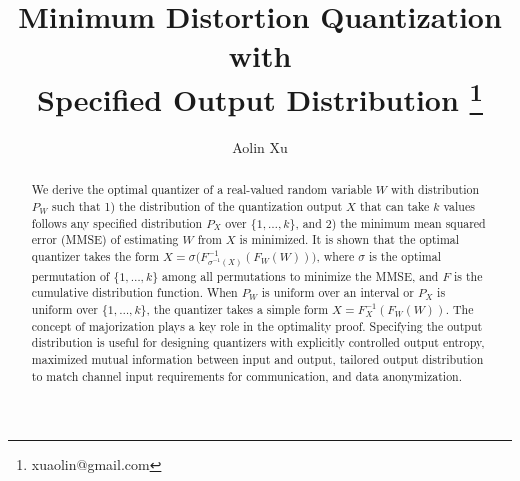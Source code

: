 \documentclass[conference]{IEEEtran}
\begin{document}
\title{Minimum Distortion Quantization with \\ Specified Output Distribution
\thanks{
 xuaolin@gmail.com}
}

\author{Aolin Xu}
\maketitle

\begin{abstract}
We derive the optimal quantizer of a real-valued random variable $W$ with distribution $P_W$ such that 1) the distribution of the quantization output $X$ that can take $k$ values follows any specified distribution $P_X$ over $\{1,\ldots,k\}$, and 2) the minimum mean squared error (MMSE) of estimating $W$ from $X$ is minimized.
It is shown that the optimal quantizer takes the form $X=\sigma\big(F_{\sigma^{-1}(X)}^{-1}(F_W(W))\big)$, where $\sigma$ is the optimal permutation of $\{1,\ldots,k\}$ among all permutations to minimize the MMSE, and $F$ is the cumulative distribution function. When $P_W$ is uniform over an interval or $P_X$ is uniform over $\{1,\ldots,k\}$, the quantizer takes a simple form $X=F_{X}^{-1}(F_W(W))$.
The concept of majorization plays a key role in the optimality proof. 
Specifying the output distribution is useful for designing quantizers with explicitly controlled output entropy, maximized mutual information between input and output, tailored output distribution to match channel input requirements for communication, and data anonymization.
\end{abstract}


\end{document}
